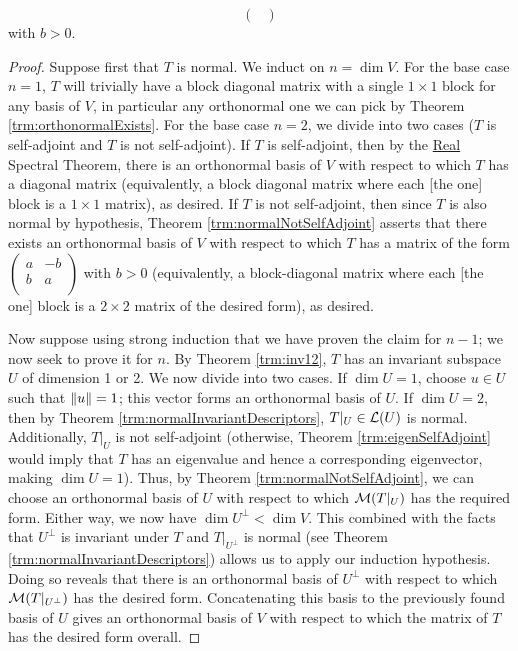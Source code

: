 \documentclass[../main.tex]{subfiles}
\begin{document}
\begin{itemize}
\begin{theorem}
\begin{enumerate}[label={\textup{(}\alph*\textup{)}}]
\begin{equation*}
\begin{pmatrix}
                \end{pmatrix}
            \end{equation*}
            with $b>0$.
        \end{enumerate}
        \begin{proof}
            Suppose first that $T$ is normal. We induct on $n=\dim V$. For the base case $n=1$, $T$ will trivially have a block diagonal matrix with a single $1\times 1$ block for any basis of $V$, in particular any orthonormal one we can pick by Theorem \ref{trm:orthonormalExists}. For the base case $n=2$, we divide into two cases ($T$ is self-adjoint and $T$ is not self-adjoint). If $T$ is self-adjoint, then by the \hyperref[trm:RealSpectral]{Real} Spectral Theorem, there is an orthonormal basis of $V$ with respect to which $T$ has a diagonal matrix (equivalently, a block diagonal matrix where each [the one] block is a $1\times 1$ matrix), as desired. If $T$ is not self-adjoint, then since $T$ is also normal by hypothesis, Theorem \ref{trm:normalNotSelfAdjoint} asserts that there exists an orthonormal basis of $V$ with respect to which $T$ has a matrix of the form $
                \left( 
                    \begin{smallmatrix}
                        a & -b\\
                        b & a\\
                    \end{smallmatrix}
                \right)
            $ with $b>0$ (equivalently, a block-diagonal matrix where each [the one] block is a $2\times 2$ matrix of the desired form), as desired.\par
            Now suppose using strong induction that we have proven the claim for $n-1$; we now seek to prove it for $n$. By Theorem \ref{trm:inv12}, $T$ has an invariant subspace $U$ of dimension 1 or 2. We now divide into two cases. If $\dim U=1$, choose $u\in U$ such that $\norm{u}=1$; this vector forms an orthonormal basis of $U$. If $\dim U=2$, then by Theorem \ref{trm:normalInvariantDescriptors}, $T|_U\in\mathcal{L}(U)$ is normal. Additionally, $T|_U$ is not self-adjoint (otherwise, Theorem \ref{trm:eigenSelfAdjoint} would imply that $T$ has an eigenvalue and hence a corresponding eigenvector, making $\dim U=1$). Thus, by Theorem \ref{trm:normalNotSelfAdjoint}, we can choose an orthonormal basis of $U$ with respect to which $\mathcal{M}(T|_U)$ has the required form. Either way, we now have $\dim U^\perp<\dim V$. This combined with the facts that $U^\perp$ is invariant under $T$ and $T|_{U^\perp}$ is normal (see Theorem \ref{trm:normalInvariantDescriptors}) allows us to apply our induction hypothesis. Doing so reveals that there is an orthonormal basis of $U^\perp$ with respect to which $\mathcal{M}(T|_{U^\perp})$ has the desired form. Concatenating this basis to the previously found basis of $U$ gives an orthonormal basis of $V$ with respect to which the matrix of $T$ has the desired form overall.\par\smallskip

\end{proof}
\end{theorem}
\end{itemize}
\end{document}
